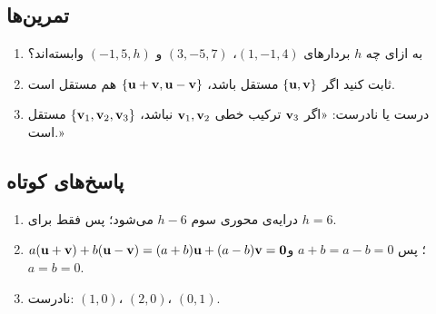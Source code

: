 \subsection*{تمرین‌ها}
\begin{enumerate}
  \item به ازای چه $h$ بردارهای $(1,-1,4)$، $(3,-5,7)$ و $(-1,5,h)$ وابسته‌اند؟
  \item ثابت کنید اگر $\{\mathbf{u},\mathbf{v}\}$ مستقل باشد، $\{\mathbf{u}+\mathbf{v},\mathbf{u}-\mathbf{v}\}$ هم مستقل است.
  \item درست یا نادرست: «اگر $\mathbf{v}_3$ ترکیب خطی $\mathbf{v}_1,\mathbf{v}_2$ نباشد، $\{\mathbf{v}_1,\mathbf{v}_2,\mathbf{v}_3\}$ مستقل است.»
\end{enumerate}

\subsection*{پاسخ‌های کوتاه}
\begin{enumerate}
  \item درایه‌ی محوری سوم $h-6$ می‌شود؛ پس فقط برای $h=6$.
  \item $a(\mathbf{u}+\mathbf{v})+b(\mathbf{u}-\mathbf{v})=(a+b)\mathbf{u}+(a-b)\mathbf{v}=\mathbf{0}$؛ پس $a+b=a-b=0$ و $a=b=0$.
  \item نادرست: $(1,0)$، $(2,0)$، $(0,1)$.
\end{enumerate}
